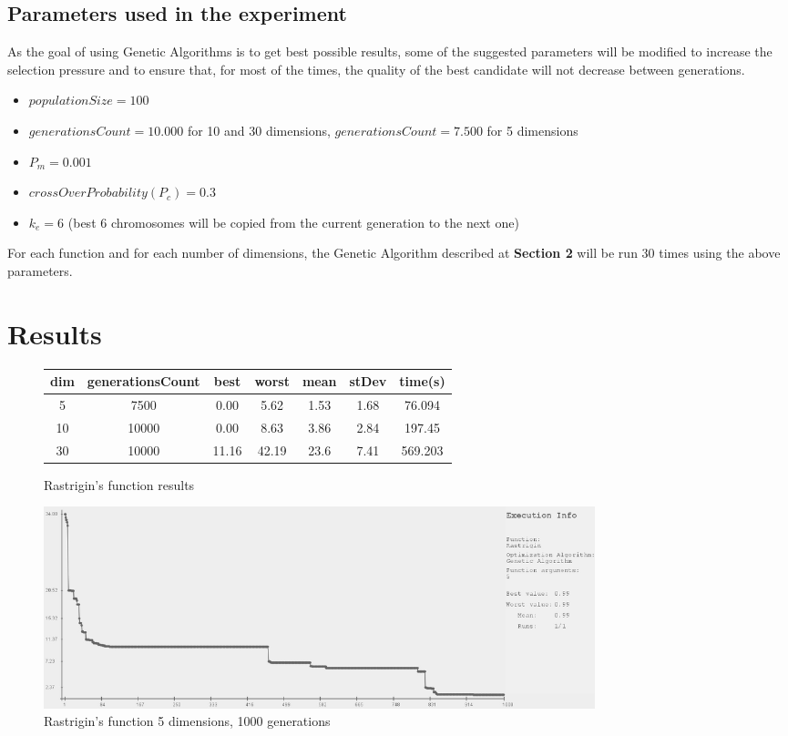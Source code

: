 \documentclass[a4paper]{article}
\begin{document}
	\subsection{Parameters used in the experiment}
	
	As the goal of using Genetic Algorithms is to get best possible results, some of the suggested parameters will be modified to increase the selection pressure and to ensure that, for most of the times, the quality of the best candidate will not decrease between generations.
	
	\begin{itemize}
		\item $populationSize = 100$
		\item $ generationsCount = 10.000 $ for 10 and 30 dimensions, $generationsCount = 7.500$ for 5 dimensions
		\item $ P_{m} = 0.001 $
		\item $crossOverProbability (P_{c}) = 0.3$
		\item $ k_{e} = 6 $ (best 6 chromosomes will be copied from the current generation to the next one)
	\end{itemize}
	
	For each function and for each number of dimensions, the Genetic Algorithm described at \textbf{Section 2} will be run 30 times using the above parameters.
	
	
	\section{Results}
	
	\begin{figure}[!h]
		\centering
		\begin{tabular}{|| c | c | c | c | c | c | c ||}
			\hline
			dim & generationsCount & best & worst & mean & stDev & time(s) \\ \hline \hline
			5 & 7500 & 0.00 & 5.62 & 1.53 & 1.68 & 76.094 \\ \hline
			10 & 10000 & 0.00 & 8.63 & 3.86 & 2.84 & 197.45 \\ \hline
			30 & 10000 & 11.16 & 42.19 & 23.6 & 7.41 & 569.203 \\ \hline
		\end{tabular}
		\caption{Rastrigin's function results}
	\end{figure}
	
	\begin{figure}[h]
		\centering
		\includegraphics[width=16cm]{rastrigin_5_1000.JPG}
		\caption{Rastrigin's function 5 dimensions, 1000 generations}
	\end{figure}
	
\end{document}
